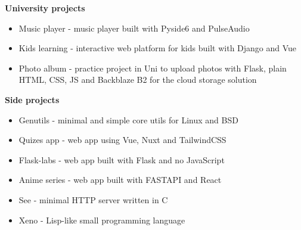 {
    {\vspace{0.5cm} \hspace{-0.5cm} \Large \textbf{University projects}}
    \begin{itemize}
        \item {Music player - music player built with Pyside6 and PulseAudio}
        \item {Kids learning - interactive web platform for kids built with Django and Vue}
        \item {
            Photo album - practice project in Uni to upload photos with Flask, 
            plain HTML, CSS, JS and Backblaze B2 for the cloud storage solution
        }
    \end{itemize}

    {\vspace{0.5cm} \hspace{-1cm} \Large \textbf{Side projects}}

    \begin{itemize}
        \item {Genutils - minimal and simple core utils for Linux and BSD}
        \item {Quizes app - web app using Vue, Nuxt and TailwindCSS}
        \item {Flask-labs - web app built with Flask and no JavaScript}
        \item {Anime series - web app built with FASTAPI and React}
        \item {See - minimal HTTP server written in C}
        \item {Xeno - Lisp-like small programming language}
    \end{itemize}
}
